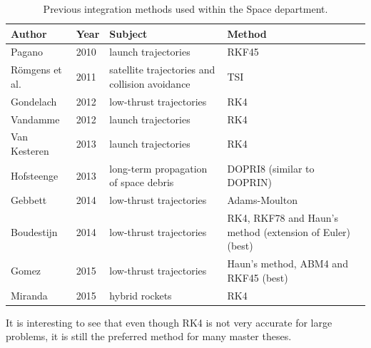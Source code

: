\begin{table}[!ht]
\begin{center}
\caption{Previous integration methods used within the Space department.}
\label{tab:intprevmethtu}
\begin{tabular}{|l|l|p{5cm}|p{5cm}|}
\hline 
\textbf{Author} & \textbf{Year}		& \textbf{Subject} & \textbf{Method} \\ \hline \hline
Pagano \cite{pagano2010global} & 2010 & launch trajectories & \ac{RKF45} \\ \hline
R\"{o}mgens et al. \cite{romgens2011verified} & 2011 & satellite trajectories and collision avoidance & \ac{TSI} \\ \hline
Gondelach \cite{gondelach2012} & 2012 & low-thrust trajectories & \ac{RK4} \\ \hline
Vandamme \cite{vandamme2012assisted} & 2012 & launch trajectories & \ac{RK4} \\ \hline
Van Kesteren \cite{kesteren2013air} & 2013 & launch trajectories & \ac{RK4} \\ \hline
Hofsteenge \cite{hofsteenge2013} & 2013 & long-term propagation of space debris & DOPRI8 (similar to DOPRIN)\\ \hline
Gebbett \cite{gebbett2014multi} & 2014 & low-thrust trajectories & Adams-Moulton \\ \hline 
Boudestijn \cite{boudestijn2014} & 2014 & low-thrust trajectories & \ac{RK4}, RKF78 and Haun's method (extension of Euler)(best) \\ \hline
Gomez \cite{gomez2015optimization} & 2015 & low-thrust trajectories & Haun's method, \ac{ABM4} and \ac{RKF45} (best) \\ \hline
Miranda \cite{miranda2015} & 2015 & hybrid rockets  & \ac{RK4} \\ \hline  
    		
\end{tabular}
\end{center}
\end{table}

It is interesting to see that even though \ac{RK4} is not very accurate for large problems, it is still the preferred method for many master theses. 


